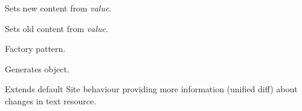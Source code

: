 \documentclass[letterpaper,10pt,english]{sphinxmanual}
\begin{document}
\begin{fulllineitems}
\begin{fulllineitems}
\end{fulllineitems}


\begin{fulllineitems}
\label{index:spy.Site.set_diff}
\end{fulllineitems}


\begin{fulllineitems}
\label{index:spy.Site.set_new_content}
Sets new content from \emph{value}.

\end{fulllineitems}


\begin{fulllineitems}
\label{index:spy.Site.set_old_content}
Sets old content from \emph{value}.

\end{fulllineitems}


\end{fulllineitems}


\begin{fulllineitems}
\label{index:spy.SiteFactory}
Factory pattern.

\begin{fulllineitems}
\label{index:spy.SiteFactory.get_site}
Generates  object.

\end{fulllineitems}


\end{fulllineitems}


\begin{fulllineitems}
\label{index:spy.TextSite}
Extends default Site behaviour providing more information (unified diff)
about changes in text resource.

\begin{fulllineitems}
\label{index:spy.TextSite.compare}
\end{fulllineitems}


\end{fulllineitems}
\end{document}
